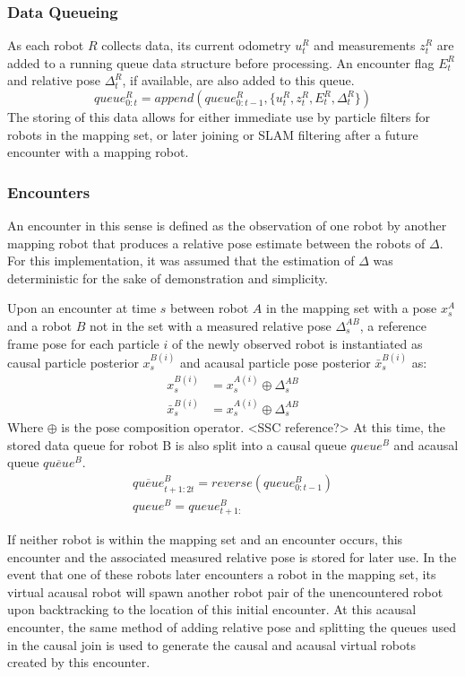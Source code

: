 \subsubsection{Data Queueing}
As each robot $R$ collects data, its current odometry $u_t^R$ and measurements $z_t^R$ are added to a running queue data structure before processing. An encounter flag $E_t^R$ and relative pose $\Delta_t^R$, if available, are also added to this queue. 
$$queue_{0:t}^R = append(queue_{0:t-1}^R, \{ u_t^R, z_t^R, E_t^R, \Delta_t^R \})$$
The storing of this data allows for either immediate use by particle filters for robots in the mapping set, or later joining or SLAM filtering after a future encounter with a mapping robot.
\vspace{0.1in}
\subsubsection{Encounters}
An encounter in this sense is defined as the observation of one robot by another mapping robot that produces a relative pose estimate between the robots of $\Delta$. For this implementation, it was assumed that the estimation of $\Delta$ was deterministic for the sake of demonstration and simplicity.

Upon an encounter at time $s$ between robot $A$ in the mapping set with a pose $x_s^A$ and a robot $B$ not in the set with a measured relative pose $\Delta_s^{AB}$, a reference frame pose for each particle $i$ of the newly observed robot is instantiated as causal particle posterior $x_s^{B(i)}$ and acausal particle pose posterior $\bar{x}_s^{B(i)}$ as:
\begin{align*}
x_s^{B(i)} &= x_s^{A(i)} \oplus \Delta_s^{AB} \\
\bar{x}_s^{B(i)} &= x_s^{A(i)} \oplus \Delta_s^{AB}
\end{align*}
Where $\oplus$ is the pose composition operator. <SSC reference?>
At this time, the stored data queue for robot B is also split into a causal queue $queue^B$ and acausal queue $\overline{queue}^B$.
\begin{align*}
\overline{queue}_{t+1:2t}^B = reverse(queue_{0:t-1}^B) \\
queue^B = queue_{t+1:}^B
\end{align*}

If neither robot is within the mapping set and an encounter occurs, this encounter and the associated measured relative pose is stored for later use. In the event that one of these robots later encounters a robot in the mapping set, its virtual acausal robot will spawn another robot pair of the unencountered robot upon backtracking to the location of this initial encounter. At this acausal encounter, the same method of adding relative pose and splitting the queues used in the causal join is used to generate the causal and acausal virtual robots created by this encounter.

